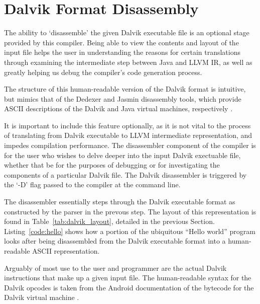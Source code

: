 \section{Dalvik Format Disassembly}
\label{sec:diss}

The ability to `disassemble' the given Dalvik executable file is an optional stage provided by this compiler. Being able to view the contents and layout of the input file helps the user in understanding the reasons for certain translations through examining the intermediate step between Java and LLVM IR, as well as greatly helping us debug the compiler's code generation process.

The structure of this human-readable version of the Dalvik format is intuitive, but mimics that of the Dedexer and Jasmin disassembly tools, which provide ASCII descriptions of the Dalvik and Java virtual machines, respectively\footnotemark {} \footnotemark {}. 

It is important to include this feature optionally, as it is not vital to the process of translating from Dalvik executable to LLVM intermediate representation, and impedes compilation performance. The disassembler component of the compiler is for the user who wishes to delve deeper into the input Dalvik exectuable file, whether that be for the purposes of debugging or for investigating the components of a particular Dalvik file. The Dalvik disassembler is triggered by the `-D' flag passed to the compiler at the command line.

The disassembler essentially steps through the Dalvik executable format as constructed by the parser in the prevous step. The layout of this representation is found in Table~\ref{tab:dalvik_layout}, detailed in the previous Section. Listing~\ref{code:hello} shows how a portion of the ubiquitous ``Hello world'' program looks after being disassembled from the Dalvik executable format into a human-readable ASCII representation.

Arguably of most use to the user and programmer are the actual Dalvik instructions that make up a given input file. The human-readable syntax for the Dalvik opcodes is taken from the Android documentation of the bytecode for the Dalvik virtual machine \cite{dvk_bytecode} \cite{dvk_opcodes}.

\newpage

\lstset{
	language=Assembler,
	basicstyle=\small,
	stringstyle=\ttfamily
}

